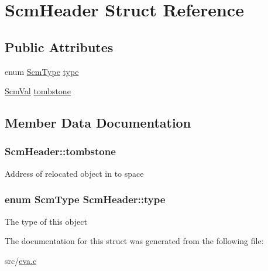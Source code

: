 \hypertarget{struct_scm_header}{\section{Scm\-Header Struct Reference}
\label{struct_scm_header}
}
\subsection*{Public Attributes}
\begin{DoxyCompactItemize}
\item 
enum \hyperlink{eva_8h_a45893d6e68c3cf00ec5a56f9ef640d7f}{Scm\-Type} \hyperlink{struct_scm_header_a43e495263fc34b12823c5403073c2092}{type}
\item 
\hyperlink{eva_8h_a9e754b130d398cb7a4000c8c7a046427}{Scm\-Val} \hyperlink{struct_scm_header_af3bd2b5b4c91e15c2426fc5c3351ce05}{tombstone}
\end{DoxyCompactItemize}


\subsection{Member Data Documentation}
\hypertarget{struct_scm_header_af3bd2b5b4c91e15c2426fc5c3351ce05}{
\subsubsection[{tombstone}]{ Scm\-Header\-::tombstone}}\label{struct_scm_header_af3bd2b5b4c91e15c2426fc5c3351ce05}
Address of relocated object in to space \hypertarget{struct_scm_header_a43e495263fc34b12823c5403073c2092}{
\subsubsection[{type}]{\setlength{\rightskip}{0pt plus 5cm}enum {\bf Scm\-Type} Scm\-Header\-::type}}\label{struct_scm_header_a43e495263fc34b12823c5403073c2092}
The type of this object 

The documentation for this struct was generated from the following file\-:\begin{DoxyCompactItemize}
\item 
src/\hyperlink{eva_8c}{eva.\-c}\end{DoxyCompactItemize}
